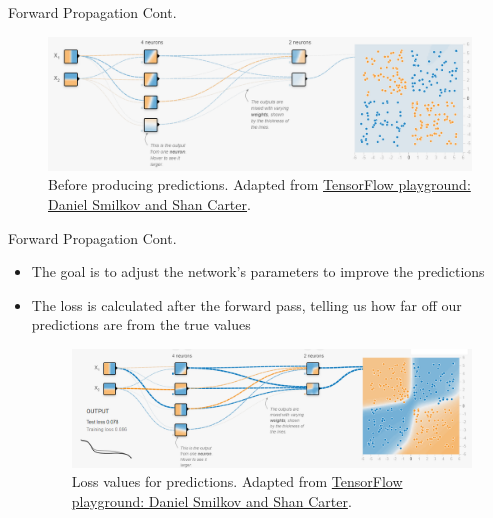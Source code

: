 \documentclass[serif, aspectratio=169]{beamer}
\begin{document}
\begin{frame}{Forward Propagation Cont.}
        \begin{figure}[h]
            \includegraphics[width=\linewidth]{pic/4/tensorflow0.png}\\
            {\scriptsize Before producing predictions. Adapted from \href{playground.tensorflow.org}{TensorFlow playground: Daniel Smilkov and Shan Carter}.}
        \end{figure}
\end{frame}

\begin{frame}[t]{Forward Propagation Cont.}
    \begin{itemize}
        \item The goal is to adjust the network’s parameters to improve the predictions
        \item The loss is calculated after the forward pass, telling us how far off our predictions are from the true values
        \begin{figure}[bh]
            \centering
            \includegraphics[width=\linewidth]{pic/4/tensorflow2.png} \\
            {\scriptsize Loss values for predictions. Adapted from \href{playground.tensorflow.org}{TensorFlow playground: Daniel Smilkov and Shan Carter}.}
        \end{figure}
    \end{itemize}
\end{frame}
\end{document}
